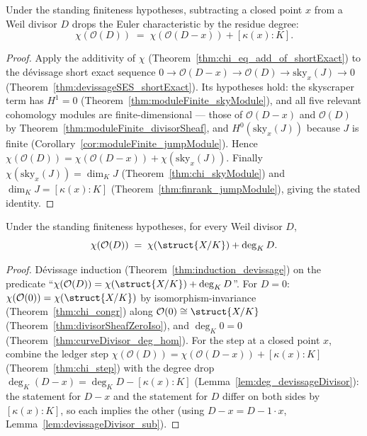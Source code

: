 \begin{theorem}
  \label{thm:chi_step}
  \leanok
  Under the standing finiteness hypotheses, subtracting a closed point \(x\) from a Weil divisor
  \(D\) drops the Euler characteristic by the residue degree:
  \[
    \chi(\mathcal O(D)) \;=\; \chi(\mathcal O(D - x)) + [\kappa(x):K].
  \]
\end{theorem}
\begin{proof}
  \leanok
  Apply the additivity of \(\chi\) (Theorem~\ref{thm:chi_eq_add_of_shortExact}) to the dévissage
  short exact sequence \(0 \to \mathcal O(D-x) \to \mathcal O(D) \to \mathrm{sky}_x(J) \to 0\)
  (Theorem~\ref{thm:devissageSES_shortExact}). Its hypotheses hold: the skyscraper term has
  \(H^1 = 0\) (Theorem~\ref{thm:moduleFinite_skyModule}), and all five relevant cohomology
  modules are finite-dimensional --- those of \(\mathcal O(D-x)\) and \(\mathcal O(D)\) by
  Theorem~\ref{thm:moduleFinite_divisorSheaf}, and \(H^0(\mathrm{sky}_x(J))\) because \(J\) is
  finite (Corollary~\ref{cor:moduleFinite_jumpModule}). Hence
  \(\chi(\mathcal O(D)) = \chi(\mathcal O(D-x)) + \chi(\mathrm{sky}_x(J))\). Finally
  \(\chi(\mathrm{sky}_x(J)) = \dim_K J\) (Theorem~\ref{thm:chi_skyModule}) and
  \(\dim_K J = [\kappa(x):K]\) (Theorem~\ref{thm:finrank_jumpModule}), giving the stated identity.
\end{proof}

\begin{theorem}
  \label{thm:chi_divisorSheaf}
  \leanok
  Under the standing finiteness hypotheses, for every Weil divisor \(D\),
  \[
    \chi(\mathcal O(D)) \;=\; \chi(\struct{X/K}) + \deg_K D .
  \]
\end{theorem}
\begin{proof}
  \leanok
  Dévissage induction (Theorem~\ref{thm:induction_devissage}) on the predicate
  ``\(\chi(\mathcal O(D)) = \chi(\struct{X/K}) + \deg_K D\)''. For \(D = 0\):
  \(\chi(\mathcal O(0)) = \chi(\struct{X/K})\) by isomorphism-invariance
  (Theorem~\ref{thm:chi_congr}) along \(\mathcal O(0) \cong \struct{X/K}\)
  (Theorem~\ref{thm:divisorSheafZeroIso}), and \(\deg_K 0 = 0\)
  (Theorem~\ref{thm:curveDivisor_deg_hom}). For the step at a closed point \(x\), combine the
  ledger step \(\chi(\mathcal O(D)) = \chi(\mathcal O(D-x)) + [\kappa(x):K]\)
  (Theorem~\ref{thm:chi_step}) with the degree drop
  \(\deg_K(D-x) = \deg_K D - [\kappa(x):K]\) (Lemma~\ref{lem:deg_devissageDivisor}): the
  statement for \(D-x\) and the statement for \(D\) differ on both sides by \([\kappa(x):K]\), so
  each implies the other (using \(D - x = D - 1\cdot x\),
  Lemma~\ref{lem:devissageDivisor_sub}).
\end{proof}

